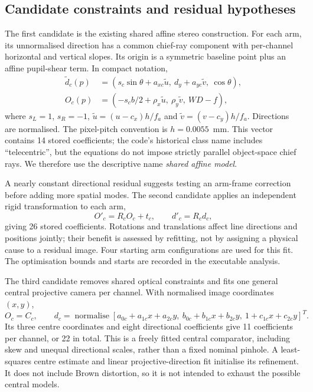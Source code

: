 \documentclass[10pt,a4paper]{article}
\begin{document}
\subsection{Candidate constraints and residual hypotheses}\label{sec:candidates}
The first candidate is the existing shared affine stereo construction. For each arm, its unnormalised direction has a common chief-ray component with per-channel horizontal and vertical slopes. Its origin is a symmetric baseline point plus an affine pupil-shear term. In compact notation,
\begin{align}
\widetilde d_c(p)&=(s_c\sin\theta+a_{xc}\widetilde u,\ d_y+a_{yc}\widetilde v,\ \cos\theta),\\
O_c(p)&=(-s_c b/2+\rho_x\widetilde u,\ \rho_y\widetilde v,\ WD-f),
\end{align}
where $s_L=1$, $s_R=-1$, $\widetilde u=(u-c_x)h/f_a$ and $\widetilde v=(v-c_y)h/f_a$. Directions are normalised. The pixel-pitch convention is $h=0.0055$~mm. This vector contains 14 stored coefficients; the code's historical class name includes ``telecentric'', but the equations do not impose strictly parallel object-space chief rays. We therefore use the descriptive name \emph{shared affine model}.

A nearly constant directional residual suggests testing an arm-frame correction before adding more spatial modes. The second candidate applies an independent rigid transformation to each arm,
\begin{equation}
O'_c=R_cO_c+t_c,\qquad d'_c=R_cd_c,
\end{equation}
giving 26 stored coefficients. Rotations and translations affect line directions and positions jointly; their benefit is assessed by refitting, not by assigning a physical cause to a residual image. Four starting arm configurations are used for this fit. The optimisation bounds and starts are recorded in the executable analysis.

The third candidate removes shared optical constraints and fits one general central projective camera per channel. With normalised image coordinates $(x,y)$,
\begin{equation}
O_c=C_c,\qquad d_c=\operatorname{normalise}\left[
 a_{0c}+a_{1c}x+a_{2c}y,\ b_{0c}+b_{1c}x+b_{2c}y,\ 1+c_{1c}x+c_{2c}y\right]^T.
\label{eq:central}
\end{equation}
Its three centre coordinates and eight directional coefficients give 11 coefficients per channel, or 22 in total. This is a freely fitted central comparator, including skew and unequal directional scales, rather than a fixed nominal pinhole. A least-squares centre estimate and linear projective-direction fit initialise its refinement. It does not include Brown distortion, so it is not intended to exhaust the possible central models.
\end{document}

